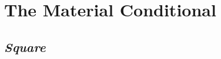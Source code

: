\documentclass[a4paper, 11pt]{article} %
\def\therefore{\ensuremath{\ldotp\dot{}\,\ldotp}}
\begin{document}
%
%
%
%
%
%
%
%
%
%
%
%



\section*{The Material Conditional}

\subsection*{\it \textbf{Square}}
\end{document}
